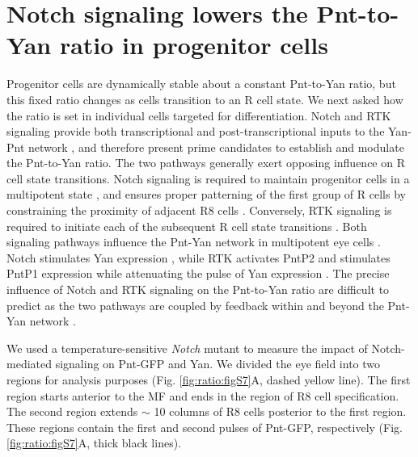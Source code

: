 \section{Notch signaling lowers the Pnt-to-Yan ratio in progenitor cells}

Progenitor cells are dynamically stable about a constant Pnt-to-Yan ratio, but this fixed ratio changes as cells transition to an R cell state. We next asked how the ratio is set in individual cells targeted for differentiation. Notch and RTK signaling provide both transcriptional and post-transcriptional inputs to the Yan-Pnt network \cite{Graham2010a}, and therefore present prime candidates to establish and modulate the Pnt-to-Yan ratio. The two pathways generally exert opposing influence on R cell state transitions. Notch signaling is required to maintain progenitor cells in a multipotent state \cite{Fortini1993}, and ensures proper patterning of the first group of R cells by constraining the proximity of adjacent R8 cells \cite{Lubensky2011,Gavish2016}. Conversely, RTK signaling is required to initiate each of the subsequent R cell state transitions \cite{Freeman1996}. Both signaling pathways influence the Pnt-Yan network in multipotent eye cells \cite{Brunner1994,Rebay1995,Rogge1995}. Notch stimulates Yan expression \cite{Rohrbaugh2002}, while RTK activates PntP2 and stimulates PntP1 expression \cite{Brunner1994,Shwartz2013} while attenuating the pulse of Yan expression \cite{Rebay1995,Pelaez2015a}. The precise influence of Notch and RTK signaling on the Pnt-to-Yan ratio are difficult to predict as the two pathways are coupled by feedback within and beyond the Pnt-Yan network \cite{Rohrbaugh2002,Kumar2003,Voas2004}.

We used a temperature-sensitive \textit{Notch} mutant \cite{Cagan1989} to measure the impact of Notch-mediated signaling on Pnt-GFP and Yan. We divided the eye field into two regions for analysis purposes (Fig. \ref{fig:ratio:figS7}A, dashed yellow line). The first region starts anterior to the MF and ends in the region of R8 cell specification. The second region extends $\sim$ 10 columns of R8 cells posterior to the first region. These regions contain the first and second pulses of Pnt-GFP, respectively (Fig. \ref{fig:ratio:figS7}A, thick black lines).

